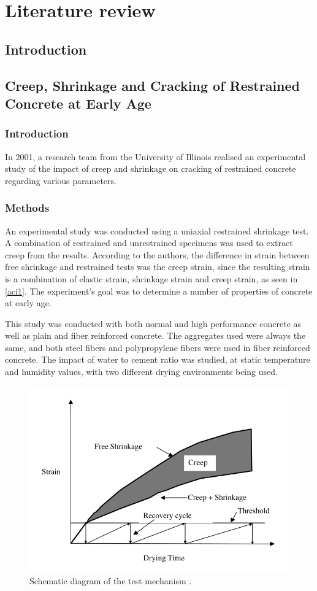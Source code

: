 \documentclass[a4paper,11pt]{memoir}
\begin{document}
\chapter{Literature review}

\section{Introduction}


\section[Creep, Shrinkage and Cracking of Restrained Concrete at Early Age]
{Creep, Shrinkage and Cracking of Restrained Concrete at Early Age
\cite{cscea}}
\subsection{Introduction}
In 2001, a research team from the University of Illinois realised an
experimental study of the impact of creep and shrinkage on cracking of
restrained concrete regarding various parameters.

\subsection{Methods}
An experimental study was conducted using a uniaxial restrained shrinkage test.
A combination of restrained and unrestrained specimens was used to extract
creep from the results. According to the authors, the difference in strain
between free shrinkage and restrained tests was the creep strain, since the
resulting strain is a combination of elastic strain, shrinkage strain and creep
strain, as seen in
\autoref{aci1}. The experiment's goal was to determine a number of properties
of concrete at early age.

This study was conducted with both normal and high performance concrete as
well as plain and fiber reinforced concrete. The aggregates used were always
the same, and both steel fibers and polypropylene fibers were used in fiber
reinforced concrete. The impact of water to cement ratio was studied, at
static temperature and humidity values, with two different drying environments
being used.

\begin{figure}
  \centering
  \includegraphics[width=.5\linewidth]{aci1}
  \caption{Schematic diagram of the test mechanism \cite{cscea}.}\label{aci1}
\end{figure}
\end{document}
